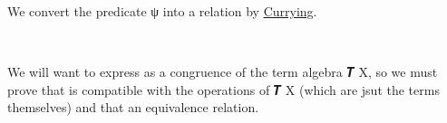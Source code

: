 \ccpad
We convert the predicate ψ into a relation by \href{https://en.wikipedia.org/wiki/Currying}{Currying}.
\ccpad
\begin{code}%
\>[0][@{}l@{\AgdaIndent{1}}]%
\>[1]\AgdaSpace{}%
\AgdaSymbol{:}\AgdaSpace{}%
\AgdaSymbol{(}\AgdaSpace{}%
\AgdaSymbol{:}\AgdaSpace{}%
\AgdaSpace{}%
\AgdaSymbol{(}\AgdaSpace{}%
\AgdaSpace{}%
\AgdaSymbol{)}\AgdaSpace{}%
\AgdaSymbol{(}\AgdaSpace{}%
\AgdaSymbol{))}\AgdaSpace{}%
\AgdaSpace{}%
\AgdaSpace{}%
\AgdaSpace{}%
\AgdaSymbol{(}\AgdaSpace{}%
\AgdaSymbol{)}\AgdaSpace{}%
\AgdaSpace{}%
\AgdaSymbol{(}\AgdaSpace{}%
\AgdaSymbol{)}\<%
\\
%
\>[1]\AgdaSpace{}%
\AgdaSpace{}%
\AgdaSpace{}%
\AgdaSpace{}%
\AgdaSymbol{=}\AgdaSpace{}%
\AgdaSpace{}%
\AgdaSpace{}%
\AgdaSymbol{(}\AgdaSpace{}%
\AgdaOperator{\AgdaInductiveConstructor{,}}\AgdaSpace{}%
\AgdaSymbol{)}\<%
\end{code}
\ccpad
We will want to express  as a congruence of the term algebra \af 𝑻 \ab X, so we must prove that  is compatible with the operations of \af 𝑻 \ab X (which are jsut the terms themselves) and that  an equivalence relation.
\ccpad
